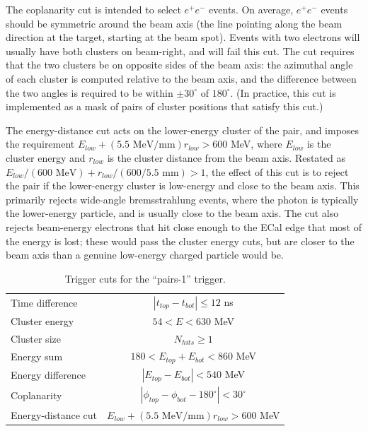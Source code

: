 The coplanarity cut is intended to select $e^+e^-$ events.
On average, $e^+e^-$ events should be symmetric around the beam axis (the line pointing along the beam direction at the target, starting at the beam spot).
Events with two electrons will usually have both clusters on beam-right, and will fail this cut.
The cut requires that the two clusters be on opposite sides of the beam axis: the azimuthal angle of each cluster is computed relative to the beam axis, and the difference between the two angles is required to be within $\pm 30^\circ$ of $180^\circ$.
(In practice, this cut is implemented as a mask of pairs of cluster positions that satisfy this cut.)

The energy-distance cut acts on the lower-energy cluster of the pair, and imposes the requirement $E_{low}+(5.5\text{ MeV/mm})r_{low}>600$ MeV, where $E_{low}$ is the cluster energy and $r_{low}$ is the cluster distance from the beam axis.
Restated as $E_{low}/(600\text{ MeV})+r_{low}/(600/5.5\text{ mm})>1$, the effect of this cut is to reject the pair if the lower-energy cluster is low-energy and close to the beam axis.
This primarily rejects wide-angle bremsstrahlung events, where the photon is typically the lower-energy particle, and is usually close to the beam axis.
The cut also rejects beam-energy electrons that hit close enough to the ECal edge that most of the energy is lost; these would pass the cluster energy cuts, but are closer to the beam axis than a genuine low-energy charged particle would be.

\begin{table}[htp]
    \begin{center}
        \caption{Trigger cuts for the ``pairs-1'' trigger.
        }
        \begin{tabular}{lc}   
            \hline \hline
            Time difference & $|t_{top}-t_{bot}|\le12$ ns \\
            Cluster energy & $54<E<630$ MeV \\
            Cluster size & $N_{hits}\ge 1$ \\
            Energy sum & $180<E_{top}+E_{bot}<860$ MeV \\
            Energy difference & $|E_{top}-E_{bot}|<540$ MeV \\
            Coplanarity & $|\phi_{top}-\phi_{bot}-180^\circ|<30^\circ$ \\
            Energy-distance cut & $E_{low}+(5.5\text{ MeV/mm})r_{low}>600$ MeV \\
            \hline \hline
        \end{tabular}
        \label{tab:trigger_cuts} 
    \end{center}
\end{table}

